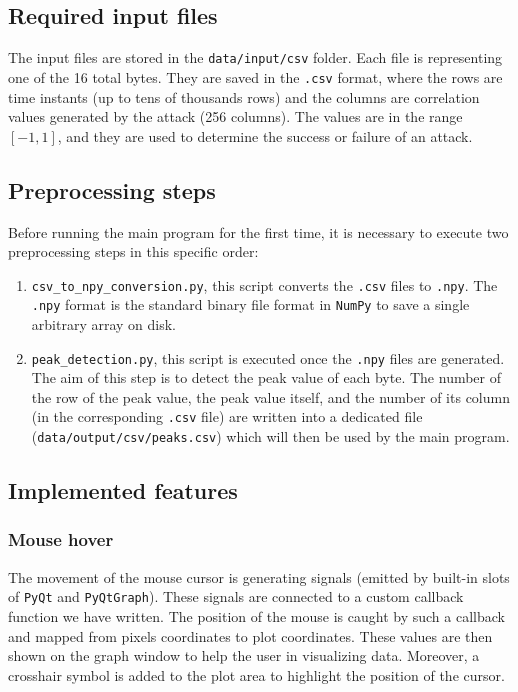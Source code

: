 \documentclass[11pt,a4paper]{article}
\begin{document}
\subsection{Required input files}
The input files are stored in the \texttt{data/input/csv} folder. Each file is representing one of the 16 total bytes. They are saved in the \texttt{.csv} format, where the rows are time instants (up to tens of thousands rows) and the columns are correlation values generated by the attack (256 columns). The values are in the range $[-1, 1]$, and they are used to determine the success or failure of an attack.

\subsection{Preprocessing steps}
Before running the main program for the first time, it is necessary to execute two preprocessing steps in this specific order:
\begin{enumerate}
    \item \texttt{csv\_to\_npy\_conversion.py}, this script converts the \texttt{.csv} files to \texttt{.npy}. The \texttt{.npy} format is the standard binary file format in \texttt{NumPy} to save a single arbitrary array on disk.
    \item \texttt{peak\_detection.py}, this script is executed once the \texttt{.npy} files are generated. The aim of this step is to detect the peak value of each byte. The number of the row of the peak value, the peak value itself, and the number of its column (in the corresponding \texttt{.csv} file) are written into a dedicated file (\texttt{data/output/csv/peaks.csv}) which will then be used by the main program.
\end{enumerate}

\subsection{Implemented features}
\subsubsection{Mouse hover}
The movement of the mouse cursor is generating signals (emitted by built-in slots of \texttt{PyQt} and \texttt{PyQtGraph}). These signals are connected to a custom callback function we have written. The position of the mouse is caught by such a callback and mapped from pixels coordinates to plot coordinates. These values are then shown on the graph window to help the user in visualizing data. Moreover, a crosshair symbol is added to the plot area to highlight the position of the cursor.
\end{document}
